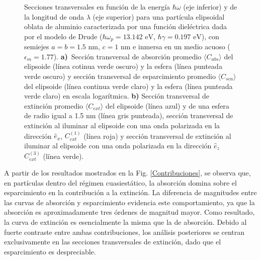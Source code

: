 \begin{figure}[h!]
	\quad%
	\caption{Secciones transversales en función de la energía $\hbar\omega$ (eje inferior) y de la longitud de onda $\lambda$ (eje superior) para una partícula elipsoidal oblata de aluminio caracterizada por una función dieléctrica dada por el modelo de Drude ($\hbar\omega_p=13.142\text{ eV}$, $\hbar\gamma=0.197\text{ eV}$), con semiejes $a=b=1.5\text{ nm}$, $c=1\text{ nm}$ e inmersa en un medio acuoso ($\epsilon_m=1.77$). \textbf{a)}~Sección transversal de absorción promedio $\langle C_{abs}\rangle$  del elipsoide (línea cotinua verde oscuro) y la esfera (línea punteada verde oscuro) y sección transversal de esparcimiento promedio $\langle C_{sca}\rangle$  del elipsoide (línea continua verde claro) y la esfera (línea punteada verde claro) en escala logarítmica. \textbf{b)} Sección transversal de extinción promedio $\langle C_{ext}\rangle$ del elipsoide (línea azul) y de una esfera de radio igual a 1.5 nm (línea gris punteada), sección transversal de extinción al iluminar al elipsoide con una onda polarizada en la dirección $\hat{e}_x$, $C_{ext}^{(1)}$  (línea roja)  y sección transversal de extinción al iluminar al elipsoide con una onda polarizada en la dirección $\hat{e}_z$ $C_{ext}^{(3)}$  (línea verde).} \label{fig:test}
\end{figure}

A partir de los resultados mostrados en la Fig. \ref{Contribuciones}, se observa que, en partículas dentro del régimen cuasiestático, la absorción domina sobre el esparcimiento en la contribución a la extinción.  La diferencia de magnitudes entre las curvas de absorción y esparcimiento evidencia este comportamiento, ya que la absorción es aproximadamente tres órdenes de magnitud mayor. Como resultado, la curva de extinción es esencialmente la misma que la de absorción. Debido al fuerte contraste entre ambas contribuciones, los análisis posteriores se centran exclusivamente en las secciones transversales de extinción, dado que el esparcimiento es despreciable.\\

